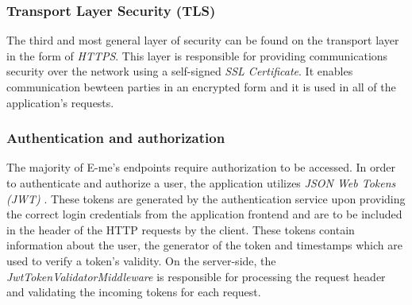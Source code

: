 \subsubsection{Transport Layer Security (TLS)}

The third and most general layer of security can be found on the transport layer in the form of \emph{HTTPS}.
This layer is responsible for providing communications security over the network using a self-signed \emph{SSL Certificate}.
It enables communication bewteen parties in an encrypted form and it is used in all of the application's requests.

\subsubsection{Authentication and authorization}

The majority of E-me's endpoints require authorization to be accessed.
In order to authenticate and authorize a user, the application utilizes \emph{JSON Web Tokens (JWT)} \cite{ethelbert2017json}.
These tokens are generated by the authentication service upon providing the correct login credentials from the application frontend and are to be
included in the header of the HTTP requests by the client.
These tokens contain information about the user, the generator of the token and timestamps which are used to verify a token's validity.
On the server-side, the \emph{JwtTokenValidatorMiddleware} is responsible for processing the request header and validating the incoming tokens for each request.